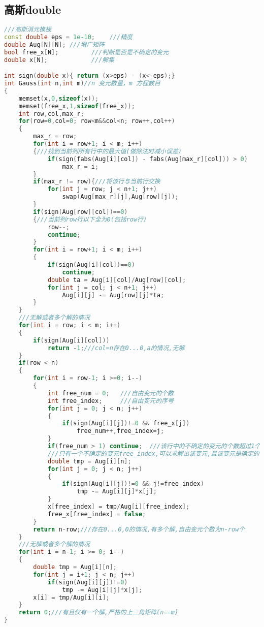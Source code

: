 \subsection{高斯double}
\begin{lstlisting}[language=C++]
///高斯消元模板
const double eps = 1e-10;    ///精度
double Aug[N][N]; ///增广矩阵
bool free_x[N];         ///判断是否是不确定的变元
double x[N];            ///解集

int sign(double x){ return (x>eps) - (x<-eps);}
int Gauss(int n,int m)//n 变元数量，m 方程数目
{
    memset(x,0,sizeof(x));
    memset(free_x,1,sizeof(free_x));
    int row,col,max_r;
    for(row=0,col=0; row<m&&col<n; row++,col++)
    {
        max_r = row;
        for(int i = row+1; i < m; i++)
        {///找到当前列所有行中的最大值(做除法时减小误差)
            if(sign(fabs(Aug[i][col]) - fabs(Aug[max_r][col])) > 0)
                max_r = i;
        }
        if(max_r != row){///将该行与当前行交换
            for(int j = row; j < n+1; j++)
                swap(Aug[max_r][j],Aug[row][j]);
        }
        if(sign(Aug[row][col])==0)
        {///当前列row行以下全为0(包括row行)
            row--;
            continue;
        }
        for(int i = row+1; i < m; i++)
        {
            if(sign(Aug[i][col])==0)
                continue;
            double ta = Aug[i][col]/Aug[row][col];
            for(int j = col; j < n+1; j++)
                Aug[i][j] -= Aug[row][j]*ta;
        }
    }
    ///无解或者多个解的情况
    for(int i = row; i < m; i++)
    {
        if(sign(Aug[i][col]))
            return -1;///col=n存在0...0,a的情况,无解
    }
    if(row < n)
    {
        for(int i = row-1; i >=0; i--)
        {
            int free_num = 0;   ///自由变元的个数
            int free_index;     ///自由变元的序号
            for(int j = 0; j < n; j++)
            {
                if(sign(Aug[i][j])!=0 && free_x[j])
                    free_num++,free_index=j;
            }
            if(free_num > 1) continue;  ///该行中的不确定的变元的个数超过1个,无法求解,它们仍然为不确定的变元
            ///只有一个不确定的变元free_index,可以求解出该变元,且该变元是确定的
            double tmp = Aug[i][n];
            for(int j = 0; j < n; j++)
            {
                if(sign(Aug[i][j])!=0 && j!=free_index)
                    tmp -= Aug[i][j]*x[j];
            }
            x[free_index] = tmp/Aug[i][free_index];
            free_x[free_index] = false;
        }
        return n-row;///存在0...0,0的情况,有多个解,自由变元个数为n-row个
    }
    ///无解或者多个解的情况
    for(int i = n-1; i >= 0; i--)
    {
        double tmp = Aug[i][n];
        for(int j = i+1; j < n; j++)
            if(sign(Aug[i][j])!=0)
                tmp -= Aug[i][j]*x[j];
        x[i] = tmp/Aug[i][i];
    }
    return 0;///有且仅有一个解,严格的上三角矩阵(n==m)
}
\end{lstlisting}
